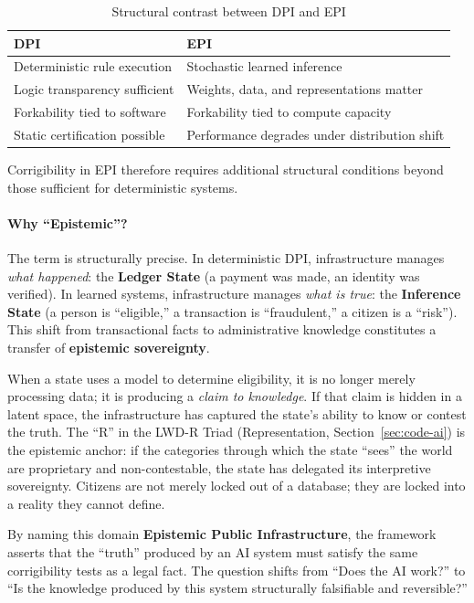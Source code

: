 \documentclass[11pt,a4paper]{article}
\theoremstyle{definition}
\begin{document}
\begin{table}[htbp]
\centering
\caption{Structural contrast between DPI and EPI}
\label{tab:dpi-epi-contrast}
\begin{tabular}{@{}ll@{}}
\toprule
\textbf{DPI} & \textbf{EPI} \\
\midrule
Deterministic rule execution & Stochastic learned inference \\
Logic transparency sufficient & Weights, data, and representations matter \\
Forkability tied to software & Forkability tied to compute capacity \\
Static certification possible & Performance degrades under distribution shift \\
\bottomrule
\end{tabular}
\end{table}

Corrigibility in EPI therefore requires additional structural conditions beyond those sufficient for deterministic systems.

\paragraph{Why ``Epistemic''?} The term is structurally precise. In deterministic DPI, infrastructure manages \textit{what happened}: the \textbf{Ledger State} (a payment was made, an identity was verified). In learned systems, infrastructure manages \textit{what is true}: the \textbf{Inference State} (a person is ``eligible,'' a transaction is ``fraudulent,'' a citizen is a ``risk''). This shift from transactional facts to administrative knowledge constitutes a transfer of \textbf{epistemic sovereignty}.

When a state uses a model to determine eligibility, it is no longer merely processing data; it is producing a \textit{claim to knowledge}. If that claim is hidden in a latent space, the infrastructure has captured the state's ability to know or contest the truth. The ``R'' in the LWD-R Triad (Representation, Section~\ref{sec:code-ai}) is the epistemic anchor: if the categories through which the state ``sees'' the world are proprietary and non-contestable, the state has delegated its interpretive sovereignty. Citizens are not merely locked out of a database; they are locked into a reality they cannot define.

By naming this domain \textbf{Epistemic Public Infrastructure}, the framework asserts that the ``truth'' produced by an AI system must satisfy the same corrigibility tests as a legal fact. The question shifts from ``Does the AI work?'' to ``Is the knowledge produced by this system structurally falsifiable and reversible?''
\end{document}
